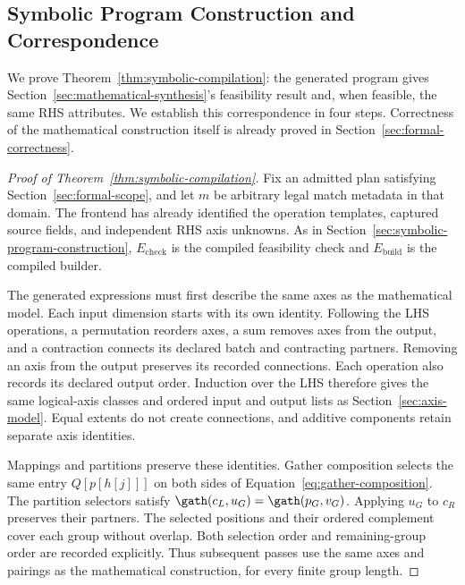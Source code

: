 \subsection{Symbolic Program Construction and Correspondence}
\label{app:symbolic-compilation-proof}
We prove Theorem~\ref{thm:symbolic-compilation}: the generated program gives
Section~\ref{sec:mathematical-synthesis}'s feasibility result and, when
feasible, the same RHS attributes. We establish this correspondence in
four steps. Correctness of the mathematical construction itself is already
proved in Section~\ref{sec:formal-correctness}.

\begin{proof}[Proof of Theorem~\ref{thm:symbolic-compilation}]
Fix an admitted plan satisfying Section~\ref{sec:formal-scope}, and let $m$
be arbitrary legal match metadata in that domain. The frontend has already
identified the operation templates, captured source fields, and independent
RHS axis unknowns. As in Section~\ref{sec:symbolic-program-construction},
$E_{\mathrm{check}}$ is the compiled feasibility check and $E_{\mathrm{build}}$ is the compiled builder.

The generated expressions must first describe the same axes as the
mathematical model. Each input dimension starts with its own identity.
Following the LHS operations, a permutation reorders axes, a sum removes
axes from the output, and a contraction connects its declared batch and
contracting partners. Removing an axis from the output preserves its
recorded connections. Each operation also records its declared output
order. Induction over the LHS therefore gives the same logical-axis
classes and ordered input and output lists as Section~\ref{sec:axis-model}.
Equal extents do not create connections, and additive components retain
separate axis identities.

Mappings and partitions preserve these identities. Gather composition
selects the same entry $Q[p[h[j]]]$ on both sides of
Equation~\eqref{eq:gather-composition}. The partition selectors satisfy
$\gath(c_L,u_G)=\gath(p_G,v_G)$. Applying $u_G$ to $c_R$ preserves
their partners. The selected positions and their ordered complement cover
each group without overlap. Both selection order and remaining-group order
are recorded explicitly. Thus subsequent passes use the same axes and
pairings as the mathematical construction, for every finite group length.


\end{proof}
